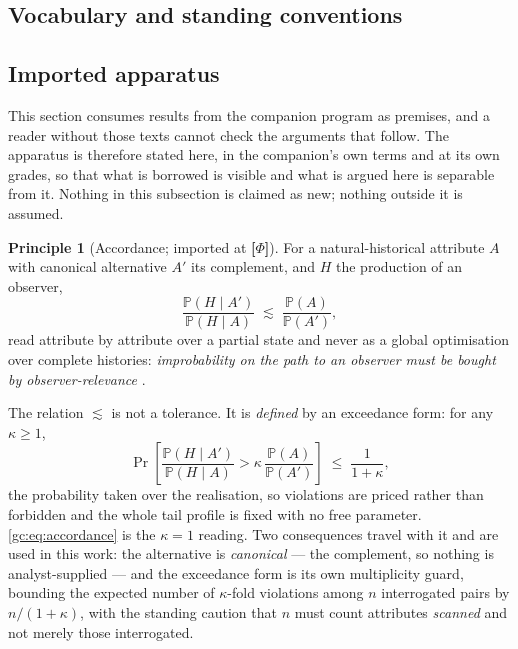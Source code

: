 \documentclass[11pt]{article}
\numberwithin{equation}{section}
\theoremstyle{plain}
\theoremstyle{definition}
\newtheorem{principle}{Principle}
\theoremstyle{remark}
\newcommand{\PP}{\mathbb{P}}
\begin{document}
\subsection{Vocabulary and standing conventions}\label{gc:sub:vocab}

\subsection{Imported apparatus}\label{gc:sub:imported}

This section consumes results from the companion program as premises,
and a reader without those texts cannot check the arguments that follow.
The apparatus is therefore stated here, in the companion's own terms and
at its own grades, so that what is borrowed is visible and what is
argued here is separable from it. Nothing in this subsection is claimed
as new; nothing outside it is assumed.

\begin{principle}[Accordance; imported at \textbf{[$\Phi$]}]
\label{gc:prin:accordance}
For a natural-historical attribute $A$ with canonical alternative $A'$
its complement, and $H$ the production of an observer,
\begin{equation}\label{gc:eq:accordance}
\frac{\PP(H\mid A')}{\PP(H\mid A)}\;\lesssim\;\frac{\PP(A)}{\PP(A')},
\end{equation}
read attribute by attribute over a partial state and never as a global
optimisation over complete histories: \emph{improbability on the path to
an observer must be bought by observer-relevance}
\cite{Nexus, NexicFoundation}.
\end{principle}

The relation $\lesssim$ is not a tolerance. It is \emph{defined} by an
exceedance form: for any $\kappa\ge1$,
\begin{equation}\label{gc:eq:accordexceed}
\Pr\left[\frac{\PP(H\mid A')}{\PP(H\mid A)}>
\kappa\,\frac{\PP(A)}{\PP(A')}\right]\;\le\;\frac{1}{1+\kappa},
\end{equation}
the probability taken over the realisation, so violations are priced
rather than forbidden and the whole tail profile is fixed with no free
parameter. \eqref{gc:eq:accordance} is the $\kappa=1$ reading. Two
consequences travel with it and are used in this work: the alternative
is \emph{canonical} --- the complement, so nothing is analyst-supplied
--- and the exceedance form is its own multiplicity guard, bounding the
expected number of $\kappa$-fold violations among $n$ interrogated pairs
by $n/(1+\kappa)$, with the standing caution that $n$ must count
attributes \emph{scanned} and not merely those interrogated.
\end{document}
